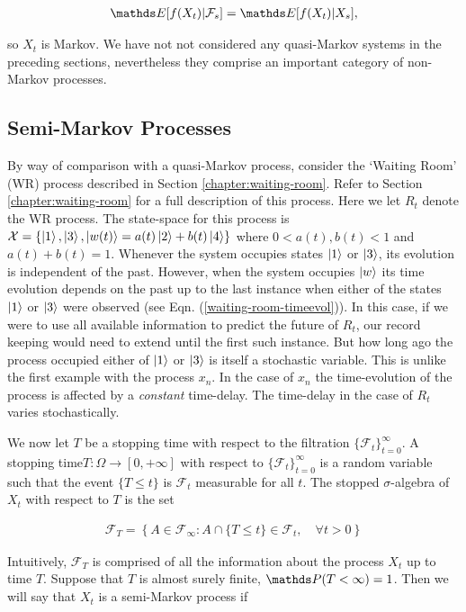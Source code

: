 \begin{align}
\bE[f(X_t) \lvert \mathcal{F}_s] = \bE[f(X_t) \lvert X_s], 
\end{align}

so $X_t$ is Markov. We have not not considered any quasi-Markov systems in the preceding sections, nevertheless they comprise an important category of non-Markov processes. 

\subsection{Semi-Markov Processes}
By way of comparison with a quasi-Markov process, consider the `Waiting Room' (WR) process described in Section \ref{chapter:waiting-room}. Refer to Section \ref{chapter:waiting-room} for a full description of this process. Here we let $R_t$ denote the WR process. The state-space for this process is $\mathcal{X} = \{\ket{1},\ket{3}, \ket{w(t)} = a(t)\ket{2} + b(t)\ket{4} \}$ where $0<a(t),b(t)<1$ and $a(t)+b(t) =1$. Whenever the system occupies states $\ket{1}$ or $\ket{3}$, its evolution is independent of the past. However, when the system occupies $\ket{w}$ its time evolution depends on the past up to the last instance when either of the states $\ket{1}$ or $\ket{3}$ were observed (see Eqn. (\ref{waiting-room-timeevol})). In this case, if we were to use all available information to predict the future of $R_t$, our record keeping would need to extend until the first such instance. But how long ago the process occupied either of $\ket{1}$ or $\ket{3}$ is itself a stochastic variable. This is unlike the first example with the process $x_n$. In the case of $x_n$ the time-evolution of the process is affected by a \textit{constant} time-delay. The time-delay in the case of $R_t$ varies stochastically. 

We now let $T$ be a stopping time with respect to the filtration $\{\mathcal{F}_t\}_{t=0}^\infty$. A stopping time\newline $T: \Omega \rightarrow [0, +\infty]$ with respect to $\{\mathcal{F}_t\}_{t=0}^\infty$ is a random variable such that the event $\{T \leq t\}$ is $\mathcal{F}_t$ measurable for all $t$. The stopped $\sigma$-algebra of $X_t$ with respect to $T$ is the set 

\begin{align}
\mathcal{F}_T = \left\{A \in \mathcal{F}_\infty : A \cap \{T \leq t\} \in \mathcal{F}_t, \quad \forall t > 0\right\}\end{align}

Intuitively, $\mathcal{F}_T$ is comprised of all the information about the process $X_t$ up to time $T$. Suppose that $T$ is almost surely finite, $\bP( T < \infty) = 1$. Then we will say that $X_t$ is a semi-Markov process if

